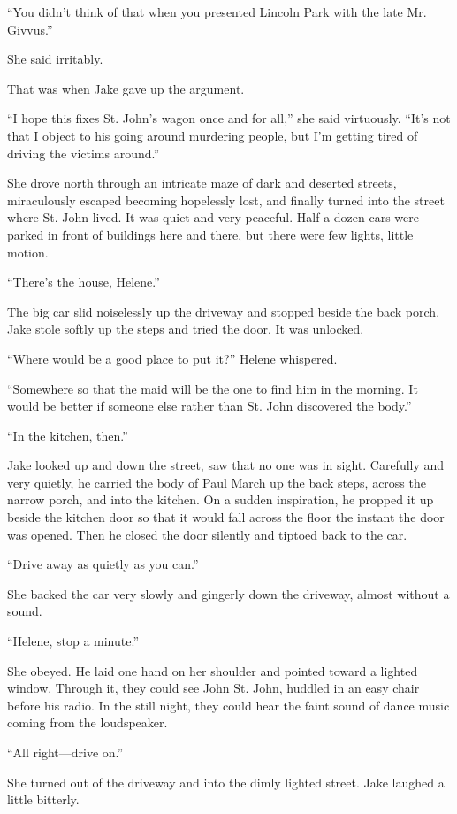 \documentclass{novel}
\begin{document}
“You didn’t think of that when you presented Lincoln Park with the late Mr. Givvus.”

She said irritably.

That was when Jake gave up the argument.

“I hope this fixes St. John’s wagon once and for all,” she said virtuously. “It’s not that I object to his going around murdering people, but I’m getting tired of driving the victims around.”

She drove north through an intricate maze of dark and deserted streets, miraculously escaped becoming hopelessly lost, and finally turned into the street where St. John lived. It was quiet and very peaceful. Half a dozen cars were parked in front of buildings here and there, but there were few lights, little motion.

“There’s the house, Helene.”

The big car slid noiselessly up the driveway and stopped beside the back porch. Jake stole softly up the steps and tried the door. It was unlocked.

“Where would be a good place to put it?” Helene whispered.

“Somewhere so that the maid will be the one to find him in the morning. It would be better if someone else rather than St. John discovered the body.”

“In the kitchen, then.”

Jake looked up and down the street, saw that no one was in sight. Carefully and very quietly, he carried the body of Paul March up the back steps, across the narrow porch, and into the kitchen. On a sudden inspiration, he propped it up beside the kitchen door so that it would fall across the floor the instant the door was opened. Then he closed the door silently and tiptoed back to the car.

“Drive away as quietly as you can.”

She backed the car very slowly and gingerly down the driveway, almost without a sound.

“Helene, stop a minute.”

She obeyed. He laid one hand on her shoulder and pointed toward a lighted window. Through it, they could see John St. John, huddled in an easy chair before his radio. In the still night, they could hear the faint sound of dance music coming from the loudspeaker.

“All right—drive on.”

She turned out of the driveway and into the dimly lighted street. Jake laughed a little bitterly.
\end{document}

